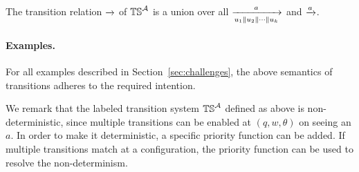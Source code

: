 The transition relation $\xrightarrow{}$ of $\mathbb{TS}^{\mathcal{A}}$ is a union over all $\xrightarrow[u_1 \parallel u_2 \parallel \cdots \parallel u_k]{a}$ and $\xrightarrow{a}$.


\paragraph*{Examples.} For all examples described in Section~\ref{sec:challenges}, the above semantics of transitions adheres to the required intention. 

\begin{remark}
We remark that the labeled transition system $\mathbb{TS}^{\mathcal{A}}$ defined as above is non-deterministic, since multiple transitions can be enabled at $(q, w, \theta)$ on seeing an $a$. In order to make it deterministic, a specific priority function can be added. If multiple transitions match at a configuration, the priority function can be used to resolve the non-determinism.
\end{remark}






